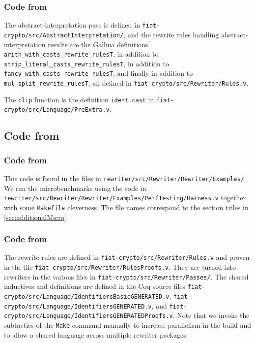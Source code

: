 \documentclass[sigplan,10pt,review,anonymous]{acmart}\settopmatter{printfolios=true,printccs=false,printacmref=false}
\begin{document}
\subsubsection{Code from }

The abstract-interpretation pass is defined in \texttt{fiat-crypto/src/AbstractInterpretation/}, and the rewrite rules handling abstract-interpretation results are the Gallina definitions \verb|arith_with_casts_rewrite_rulesT|, in addition to \verb|strip_literal_casts_rewrite_rulesT|, in addition to \verb|fancy_with_casts_rewrite_rulesT|, and finally in addition to \verb|mul_split_rewrite_rulesT|, all defined in \texttt{fiat-crypto/src/Rewriter/Rules.v}.

The \verb|clip| function is the definition \verb|ident.cast| in \texttt{fiat-crypto/src/Language/PreExtra.v}.

\subsection{Code from }

\subsubsection{Code from }

This code is found in the files in \texttt{rewriter/src/Rewriter/Rewriter/Examples/}.
We ran the microbenchmarks using the code in \texttt{rewriter/src/Rewriter/Rewriter/Examples/PerfTesting/Harness.v} together with some \texttt{Makefile} cleverness.
The file names correspond to the section titles in \autoref{sec:additionalMicro}.

\subsubsection{Code from }

The rewrite rules are defined in \texttt{fiat-crypto/src/Rewriter/Rules.v} and proven in the file \texttt{fiat-crypto/src/Rewriter/RulesProofs.v}.
They are turned into rewriters in the various files in \texttt{fiat-crypto/src/Rewriter/Passes/}.
The shared inductives and definitions are defined in the Coq source files \texttt{fiat-crypto/src/Language/IdentifiersBasicGENERATED.v}, \texttt{fiat-crypto/src/Language/IdentifiersGENERATED.v}, and \texttt{fiat-crypto/src/Language/IdentifiersGENERATEDProofs.v}.
Note that we invoke the subtactics of the \texttt{Make} command manually to increase parallelism in the build and to allow a shared language across multiple rewriter packages.
\end{document}
